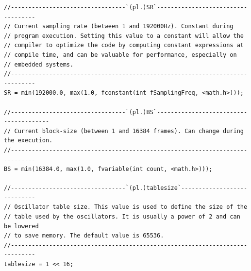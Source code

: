 \documentclass{article}
\begin{document}
\begin{lstlisting}[caption=\texttt{platform.lib}]
//---------------------------------`(pl.)SR`-----------------------------------
// Current sampling rate (between 1 and 192000Hz). Constant during
// program execution. Setting this value to a constant will allow the
// compiler to optimize the code by computing constant expressions at
// compile time, and can be valuable for performance, especially on
// embedded systems.
//-----------------------------------------------------------------------------
SR = min(192000.0, max(1.0, fconstant(int fSamplingFreq, <math.h>)));

//---------------------------------`(pl.)BS`---------------------------------------
// Current block-size (between 1 and 16384 frames). Can change during the execution.
//-----------------------------------------------------------------------------
BS = min(16384.0, max(1.0, fvariable(int count, <math.h>)));

//---------------------------------`(pl.)tablesize`----------------------------
// Oscillator table size. This value is used to define the size of the
// table used by the oscillators. It is usually a power of 2 and can be lowered
// to save memory. The default value is 65536.
//-----------------------------------------------------------------------------
tablesize = 1 << 16;
\end{lstlisting}
\end{document}
